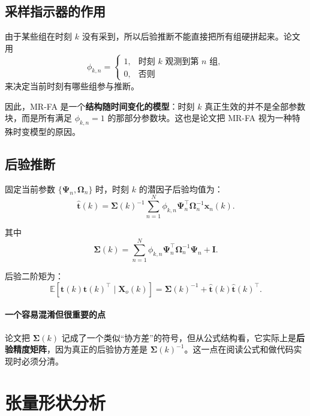 \documentclass[UTF8]{ctexart}
\begin{document}
\subsection{采样指示器的作用}

由于某些组在时刻 $k$ 没有采到，所以后验推断不能直接把所有组硬拼起来。论文用
\begin{equation}
    \phi_{k,n} =
    \begin{cases}
        1, & \text{时刻 } k \text{ 观测到第 } n \text{ 组}, \\
        0, & \text{否则}
    \end{cases}
\end{equation}
来决定当前时刻有哪些组参与推断。

因此，MR-FA 是一个\textbf{结构随时间变化的模型}：时刻 $k$ 真正生效的并不是全部参数块，而是所有满足 $\phi_{k,n}=1$ 的那部分参数块。这也是论文把 MR-FA 视为一种特殊时变模型的原因。

\subsection{后验推断}

固定当前参数 $\{\bm{\Psi}_n,\bm{\Omega}_n\}$ 时，时刻 $k$ 的潜因子后验均值为：
\begin{equation}
    \hat{\bm{t}}(k)
    =
    \bm{\Sigma}(k)^{-1}
    \sum_{n=1}^{N}
    \phi_{k,n}\bm{\Psi}_n^\top \bm{\Omega}_n^{-1}\bm{x}_n(k).
\end{equation}

其中
\begin{equation}
    \bm{\Sigma}(k)
    =
    \sum_{n=1}^{N}
    \phi_{k,n}\bm{\Psi}_n^\top \bm{\Omega}_n^{-1}\bm{\Psi}_n
    + \bm{I}.
\end{equation}

后验二阶矩为：
\begin{equation}
    \mathbb{E}\!\left[\bm{t}(k)\bm{t}(k)^\top \mid \bm{X}_o(k)\right]
    =
    \bm{\Sigma}(k)^{-1}
    + \hat{\bm{t}}(k)\hat{\bm{t}}(k)^\top.
\end{equation}

\paragraph{一个容易混淆但很重要的点}
论文把 $\bm{\Sigma}(k)$ 记成了一个类似“协方差”的符号，但从公式结构看，它实际上是\textbf{后验精度矩阵}，因为真正的后验协方差是 $\bm{\Sigma}(k)^{-1}$。这一点在阅读公式和做代码实现时必须分清。

\section{张量形状分析}
\end{document}
